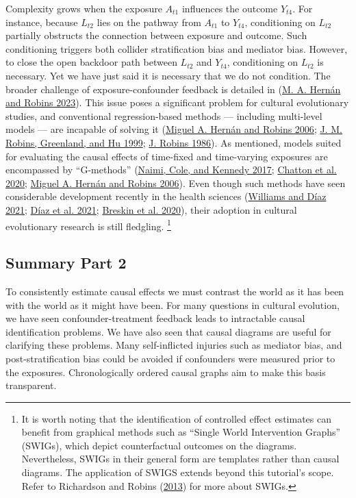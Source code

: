 \documentclass[
  singlecolumn]{report}
\begin{document}
Complexity grows when the exposure \(A_{t1}\) influences the outcome
\(Y_{t4}\). For instance, because \(L_{t2}\) lies on the pathway from
\(A_{t1}\) to \(Y_{t4}\), conditioning on \(L_{t2}\) partially obstructs
the connection between exposure and outcome. Such conditioning triggers
both collider stratification bias and mediator bias. However, to close
the open backdoor path between \(L_{t2}\) and \(Y_{t4}\), conditioning
on \(L_{t2}\) is necessary. Yet we have just said it is necessary that
we do not condition. The broader challenge of exposure-confounder
feedback is detailed in (\protect\hyperlink{ref-hernuxe1n2023a}{M. A.
Hernán and Robins 2023}). This issue poses a significant problem for
cultural evolutionary studies, and conventional regression-based methods
--- including multi-level models --- are incapable of solving it
(\protect\hyperlink{ref-hernuxe1n2006}{Miguel A. Hernán and Robins
2006}; \protect\hyperlink{ref-robins1999}{J. M. Robins, Greenland, and
Hu 1999}; \protect\hyperlink{ref-robins1986}{J. Robins 1986}). As
mentioned, models suited for evaluating the causal effects of time-fixed
and time-varying exposures are encompassed by ``G-methods''
(\protect\hyperlink{ref-naimi2017}{Naimi, Cole, and Kennedy 2017};
\protect\hyperlink{ref-chatton2020}{Chatton et al. 2020};
\protect\hyperlink{ref-hernuxe1n2006}{Miguel A. Hernán and Robins
2006}). Even though such methods have seen considerable development
recently in the health sciences
(\protect\hyperlink{ref-williams2021}{Williams and Díaz 2021};
\protect\hyperlink{ref-duxedaz2021}{Díaz et al. 2021};
\protect\hyperlink{ref-breskin2020}{Breskin et al. 2020}), their
adoption in cultural evolutionary research is still fledgling.
\footnote{It is worth noting that the identification of controlled
  effect estimates can benefit from graphical methods such as ``Single
  World Intervention Graphs'' (SWIGs), which depict counterfactual
  outcomes on the diagrams. Nevertheless, SWIGs in their general form
  are templates rather than causal diagrams. The application of SWIGS
  extends beyond this tutorial's scope. Refer to Richardson and Robins
  (\protect\hyperlink{ref-richardson2013}{2013}) for more about SWIGs.}

\hypertarget{summary-part-2}{%
\subsection{Summary Part 2}\label{summary-part-2}}

To consistently estimate causal effects we must contrast the world as it
has been with the world as it might have been. For many questions in
cultural evolution, we have seen confounder-treatment feedback leads to
intractable causal identification problems. We have also seen that
causal diagrams are useful for clarifying these problems. Many
self-inflicted injuries such as mediator bias, and post-stratification
bias could be avoided if confounders were measured prior to the
exposures. Chronologically ordered causal graphs aim to make this basis
transparent.
\end{document}
